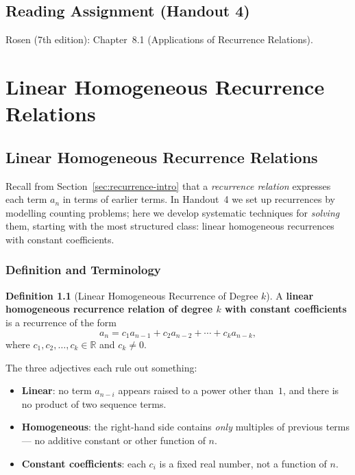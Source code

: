 \documentclass[11pt, a4paper, notitlepage]{report}
\theoremstyle{definition}
\newtheorem{definition}[theorem]{Definition}
\theoremstyle{remark}
\begin{document}
\section*{Reading Assignment (Handout 4)}
Rosen (7th edition): Chapter~8.1 (Applications of Recurrence Relations).


\chapter{Linear Homogeneous Recurrence Relations}
\label{chap:linear-homo}

\section{Linear Homogeneous Recurrence Relations}
\label{sec:lhrr}

Recall from Section~\ref{sec:recurrence-intro} that a \emph{recurrence relation} expresses
each term $a_n$ in terms of earlier terms.  In Handout~4 we set up recurrences by modelling
counting problems; here we develop systematic techniques for \emph{solving} them, starting
with the most structured class: linear homogeneous recurrences with constant coefficients.

\subsection{Definition and Terminology}
\label{subsec:lhrr-def}

\begin{definition}[Linear Homogeneous Recurrence of Degree $k$]
\label{def:lhrr}
A \textbf{linear homogeneous recurrence relation of degree $k$ with constant coefficients}
is a recurrence of the form
\[
  a_n = c_1 a_{n-1} + c_2 a_{n-2} + \cdots + c_k a_{n-k},
\]
where $c_1, c_2, \ldots, c_k \in \mathbb{R}$ and $c_k \neq 0$.
\end{definition}

The three adjectives each rule out something:
\begin{itemize}
  \item \textbf{Linear}: no term $a_{n-i}$ appears raised to a power other than~$1$, and
        there is no product of two sequence terms.
  \item \textbf{Homogeneous}: the right-hand side contains \emph{only} multiples of previous
        terms — no additive constant or other function of $n$.
  \item \textbf{Constant coefficients}: each $c_i$ is a fixed real number, not a function
        of $n$.
\end{itemize}
\end{document}
